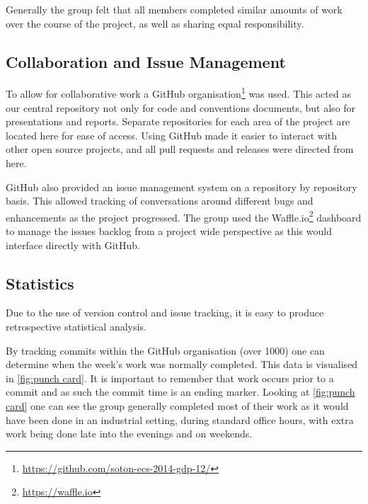 Generally the group felt that all members completed similar amounts of work over the course of the project, as well as sharing equal responsibility.

\subsection{Collaboration and Issue Management}
To allow for collaborative work a GitHub organisation\footnote{\url{https://github.com/soton-ecs-2014-gdp-12/}} was used. This acted as our central repository not only for code and conventions documents, but also for presentations and reports. Separate repositories for each area of the project are located here for ease of access. Using GitHub made it easier to interact with other open source projects, and all pull requests and releases were directed from here.

GitHub also provided an issue management system on a repository by repository basis. This allowed tracking of conversations around different bugs and enhancements as the project progressed. The group used the Waffle.io\footnote{\url{https://waffle.io}} dashboard to manage the issues backlog from a project wide perspective as this would interface directly with GitHub.

\subsection{Statistics}

Due to the use of version control and issue tracking, it is easy to produce retrospective statistical analysis.

By tracking commits within the GitHub organisation (over 1000) one can determine when the week's work was normally completed. This data is visualised in \autoref{fig:punch card}. It is important to remember that work occurs prior to a commit and as such the commit time is an ending marker. Looking at \autoref{fig:punch card} one can see the group generally completed most of their work as it would have been done in an industrial setting, during standard office hours, with extra work being done late into the evenings and on weekends.

